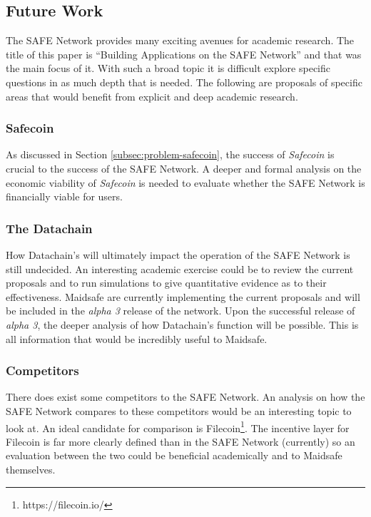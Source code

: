 \subsection{Future Work}

The SAFE Network provides many exciting avenues for academic research. The title of this paper is ``Building Applications on the SAFE Network'' and that was the main focus of it. With such a broad topic it is difficult explore specific questions in as much depth that is needed. The following are proposals of specific areas that would benefit from explicit  and deep academic research.

\subsubsection{Safecoin}

As discussed in Section \ref{subsec:problem-safecoin}, the success of \textit{Safecoin} is crucial to the success of the SAFE Network. A deeper and formal analysis on the economic viability of \textit{Safecoin} is needed to evaluate whether the SAFE Network is financially viable for users.

\subsubsection{The Datachain}

How Datachain's will ultimately impact the operation of the SAFE Network is still undecided. An interesting academic exercise could be to review the current proposals and to run simulations to give quantitative evidence as to their effectiveness. Maidsafe are currently implementing the current proposals and will be included in the \textit{alpha 3} release of the network. Upon the successful release of \textit{alpha 3}, the deeper analysis of how Datachain's function will be possible. This is all information that would be incredibly useful to Maidsafe.

\subsubsection{Competitors}

There does exist some competitors to the SAFE Network. An analysis on how the SAFE Network compares to these competitors would be an interesting topic to look at. An ideal candidate for comparison is Filecoin\footnote{https://filecoin.io/}. The incentive layer for Filecoin is far more clearly defined than in the SAFE Network (currently) so an evaluation between the two could be beneficial academically and to Maidsafe themselves.
